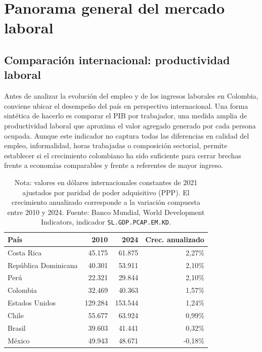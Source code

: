 \section{Panorama general del mercado laboral}

\subsection{Comparación internacional: productividad laboral}

Antes de analizar la evolución del empleo y de los ingresos laborales en Colombia, conviene ubicar el desempeño del país en perspectiva internacional. Una forma sintética de hacerlo es comparar el PIB por trabajador, una medida amplia de productividad laboral que aproxima el valor agregado generado por cada persona ocupada. Aunque este indicador no captura todas las diferencias en calidad del empleo, informalidad, horas trabajadas o composición sectorial, permite establecer si el crecimiento colombiano ha sido suficiente para cerrar brechas frente a economías comparables y frente a referentes de mayor ingreso.

\begin{table}[H]
\centering
\caption{PIB por trabajador y crecimiento anualizado, 2010--2024}
\label{tab:pib_trabajador_internacional}
\begin{tabular}{lrrr}
\toprule
País & 2010 & 2024 & Crec. anualizado \\
\midrule
Costa Rica & 45.175 & 61.875 & 2,27\% \\
República Dominicana & 40.301 & 53.911 & 2,10\% \\
Perú & 22.321 & 29.844 & 2,10\% \\
Colombia & 32.469 & 40.363 & 1,57\% \\
Estados Unidos & 129.284 & 153.544 & 1,24\% \\
Chile & 55.677 & 63.924 & 0,99\% \\
Brasil & 39.603 & 41.441 & 0,32\% \\
México & 49.943 & 48.671 & -0,18\% \\
\bottomrule
\end{tabular}
\caption*{\footnotesize Nota: valores en dólares internacionales constantes de 2021 ajustados por paridad de poder adquisitivo (PPP). El crecimiento anualizado corresponde a la variación compuesta entre 2010 y 2024. Fuente: Banco Mundial, World Development Indicators, indicador \texttt{SL.GDP.PCAP.EM.KD}.}
\end{table}

